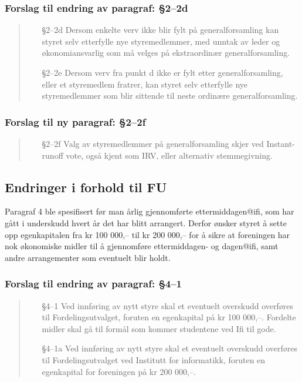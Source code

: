 \documentclass[10pt,norsk,a4paper]{article}
\begin{document}
\subsubsection{Forslag til endring av paragraf: §2--2d}
\begin{quote}
	\begin{enumerate}
		\item[§2--2d] Dersom enkelte verv ikke blir fylt på generalforsamling kan styret selv etterfylle nye styremedlemmer, med unntak av leder og økonomiansvarlig som må velges på ekstraordinær generalforsamling.
		\item[§2--2e] Dersom verv fra punkt d ikke er fylt etter generalforsamling, eller et styremedlem fratrer, kan styret selv etterfylle nye styremedlemmer som blir sittende til neste ordinære generalforsamling.
	\end{enumerate}
\end{quote}

\subsubsection{Forslag til ny paragraf: §2--2f}
\begin{quote}
	\begin{enumerate}
		\item[§2--2f] Valg av styremedlemmer på generalforsamling skjer ved Instant-runoff vote, også kjent som IRV, eller alternativ stemmegivning.
	\end{enumerate}
\end{quote}

\subsection{Endringer i forhold til FU}
Paragraf 4 ble spesifisert før man årlig gjennomførte ettermiddagen@ifi, som har gått i underskudd hvert år det har blitt arrangert. Derfor ønsker styret å sette opp egenkapitalen fra kr 100 000,– til kr 200 000,– for å sikre at foreningen har nok økonomiske midler til å gjennomføre ettermiddagen- og dagen@ifi, samt andre arrangementer som eventuelt blir holdt.

\subsubsection{Forslag til endring av paragraf: §4--1}
\begin{quote}
	\begin{enumerate}
        \item[§4--1] Ved innføring av nytt styre skal et eventuelt overskudd overføres til Fordelingsutvalget, foruten en egenkapital på kr 100 000,–. Fordelte midler skal gå til formål som kommer studentene ved Ifi til gode.
        \item[§4--1a] Ved innføring av nytt styre skal et eventuelt overskudd overføres til Fordelingsutvalget ved Institutt for informatikk, foruten en egenkapital for foreningen på kr 200 000,–.
	\end{enumerate}
\end{quote}
\end{document}
